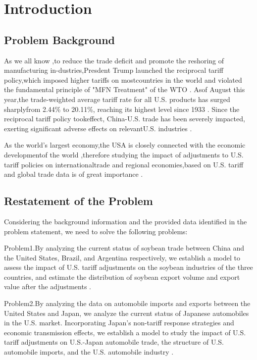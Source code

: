 \documentclass{apmcmthesis}
\begin{document}
\newpage
\tableofcontents


\newpage
\pagestyle{mainmatterstyle}
\setcounter{page}{1}
\section{Introduction}

\subsection{Problem Background}
As we all know ,to reduce the trade deficit and promote the reshoring of manufacturing in-dustries,Presdent Trump launched the reciprocal tariff policy,which imposed higher tariffs on mostcountries in the world and violated the fundamental principle of "MFN Treatment" of the WTO \cite{whitehouse2025reciprocal}. Asof August this year,the trade-weighted average tariff rate for all U.S. products has surged sharplyfrom 2.44\% to 20.11\%, reaching its highest level since 1933 \cite{yale2025tariffs}. Since the reciprocal tariff policy tookeffect, China-U.S. trade has been severely impacted, exerting significant adverse effects on relevantU.S. industries \cite{gacc2025stats}.

As the world's largest economy,the USA is closely connected with the economic developmentof the world ,therefore studying the impact of adjustments to U.S. tariff policies on internationaltrade and regional economies,based on U.S. tariff and global trade data is of great importance \cite{worldbank2025prospects}.

\subsection{Restatement of the Problem}
Considering the background information and the provided data identiﬁed in the problem statement, we need
to solve the following problems:

Problem1.By analyzing the current status of soybean trade between China and the United States, Brazil, and Argentina respectively, we establish a model to assess the impact of U.S. tariff adjustments on the soybean industries of the three countries, and estimate the distribution of soybean export volume and export value after the adjustments \cite{usda2025oilseeds}.

Problem2.By analyzing the data on automobile imports and exports between the United States and Japan, we analyze the current status of Japanese automobiles in the U.S. market. Incorporating Japan's non-tariff response strategies and economic transmission effects, we establish a model to study the impact of U.S. tariff adjustments on U.S.-Japan automobile trade, the structure of U.S. automobile imports, and the U.S. automobile industry \cite{jama2025statistics}.
\end{document}
